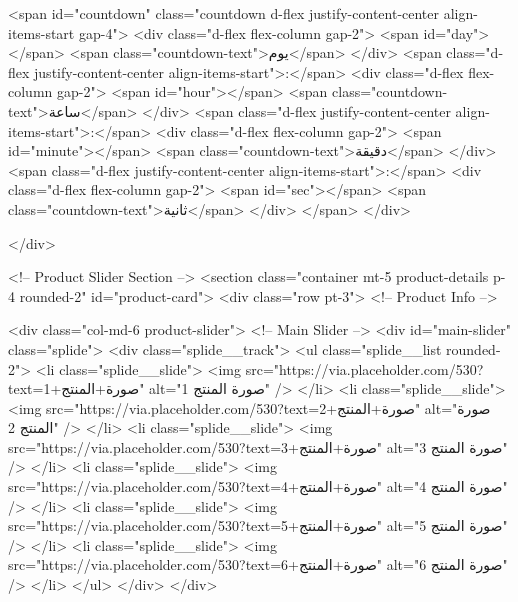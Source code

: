         <span id="countdown" class="countdown d-flex justify-content-center align-items-start gap-4">
          <div class="d-flex flex-column gap-2">
            <span id="day"></span>
            <span class="countdown-text">يوم</span>
          </div>
          <span class="d-flex justify-content-center align-items-start">:</span>
          <div class="d-flex flex-column gap-2">
            <span id="hour"></span>
            <span class="countdown-text">ساعة</span>
          </div>
          <span class="d-flex justify-content-center align-items-start">:</span>
          <div class="d-flex flex-column gap-2">
            <span id="minute"></span>
            <span class="countdown-text">دقيقة</span>
          </div>
          <span class="d-flex justify-content-center align-items-start">:</span>
          <div class="d-flex flex-column gap-2">
            <span id="sec"></span>
            <span class="countdown-text">ثانية</span>
          </div>
        </span>
      </div>

    </div>

    <!-- Product Slider Section -->
    <section class="container mt-5 product-details p-4 rounded-2" id="product-card">
      <div class="row pt-3">
        <!-- Product Info -->

        <div class="col-md-6 product-slider">
          <!-- Main Slider -->
          <div id="main-slider" class="splide">
            <div class="splide__track">
              <ul class="splide__list rounded-2">
                <li class="splide__slide">
                  <img src="https://via.placeholder.com/530?text=صورة+المنتج+1" alt="صورة المنتج 1" />
                </li>
                <li class="splide__slide">
                  <img src="https://via.placeholder.com/530?text=صورة+المنتج+2" alt="صورة المنتج 2" />
                </li>
                <li class="splide__slide">
                  <img src="https://via.placeholder.com/530?text=صورة+المنتج+3" alt="صورة المنتج 3" />
                </li>
                <li class="splide__slide">
                  <img src="https://via.placeholder.com/530?text=صورة+المنتج+4" alt="صورة المنتج 4" />
                </li>
                <li class="splide__slide">
                  <img src="https://via.placeholder.com/530?text=صورة+المنتج+5" alt="صورة المنتج 5" />
                </li>
                <li class="splide__slide">
                  <img src="https://via.placeholder.com/530?text=صورة+المنتج+6" alt="صورة المنتج 6" />
                </li>
              </ul>
            </div>
          </div>

